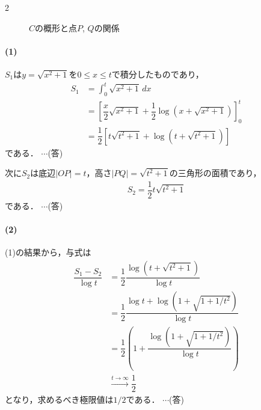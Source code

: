 \documentclass[../../main.tex]{subfiles}
\begin{document}
\begin{multicols}{2}
\begin{figure}[H]
    \caption{$C$の概形と点$P$, $Q$の関係}
    \label{2011-2:fig:1}
  \end{figure}

  \paragraph{(1)}
  $S_1$は$y=\sqrt{x^2+1}$を$0\le x\le t$で積分したものであり，
  \begin{align}
    S_1
    & = \int_{0}^{t} \sqrt{x^2+1} \, dx                                                \\
    & = \left[\dfrac{x}{2}\sqrt{x^2+1} + \dfrac{1}{2}\log(x+\sqrt{x^2+1})\right]_{0}^{t} \\
    & = \dfrac{1}{2}\left[t\sqrt{t^2+1} + \log(t+\sqrt{t^2+1})\right]
  \end{align}
  である． $\cdots$(答)

  次に$S_2$は底辺$|OP|=t$，高さ$|PQ|=\sqrt{t^2+1}$の三角形の面積であり，
  \begin{align}
    S_2 = \dfrac{1}{2}t\sqrt{t^2+1}
  \end{align}
  である． $\cdots$(答)

  \paragraph{(2)}
  (1)の結果から，与式は
  \begin{align}
    \dfrac{S_1 - S_2}{\log t}
    & = \dfrac{1}{2}\dfrac{\log(t+\sqrt{t^2+1})}{\log t}                   \\
    & = \dfrac{1}{2}\dfrac{\log t + \log(1+\sqrt{1+1/t^2})}{\log t}        \\
    & = \dfrac{1}{2}\left(1+\dfrac{\log (1+\sqrt{1+1/t^2})}{\log t}\right) \\
    & \xrightarrow{t \to \infty} \dfrac{1}{2}
  \end{align}
  となり，求めるべき極限値は$1/2$である． $\cdots$(答)


\end{multicols}
\end{document}
